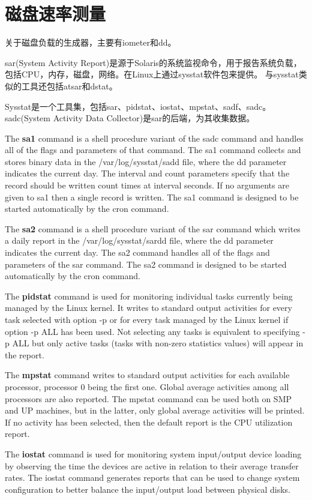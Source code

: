 \section{磁盘速率测量}
关于磁盘负载的生成器，主要有iometer和dd。

sar(System Activity Report)是源于Solaris的系统监视命令，用于报告系统负载，包括CPU，内存，磁盘，网络\cite{wikipedia}。在Linux上通过sysstat软件包来提供。
与sysstat类似的工具还包括atsar和dstat。

Sysstat是一个工具集，包括sar、pidstat、iostat、mpstat、sadf、sadc。sadc(System Activity Data Collector)是sar的后端，为其收集数据。

The \textbf{sa1} command is a shell procedure variant of the sadc command and handles all of the flags and parameters of that command. The sa1 command collects and stores binary data in the /var/log/sysstat/sadd file, where the dd parameter indicates the current day. The interval and  count  parameters specify that the record should be written count times at interval seconds. If no arguments are given to sa1 then a single record is written. The sa1 command is designed to be started automatically by the cron command.

The  \textbf{sa2}  command  is  a  shell  procedure variant of the sar command which writes a daily report in the /var/log/sysstat/sardd file, where the dd parameter indicates the current day. The sa2 command handles all of the flags and parameters of the sar command. The sa2 command is designed to be started automatically by the cron command.

The \textbf{pidstat} command is used for monitoring individual tasks currently being managed by the Linux kernel.  It writes to standard output  activities for  every  task  selected with option -p or for every task managed by the Linux kernel if option -p ALL has been used. Not selecting any tasks is
equivalent to specifying -p ALL but only active tasks (tasks with non-zero statistics values) will appear in the report.

The  \textbf{mpstat} command writes to standard output activities for each available processor, processor 0 being the first one.  Global average activities among all processors are also reported.  The mpstat command can be used both on SMP and UP machines, but in the latter, only global average activities will be printed. If no activity has been selected, then the default report is the CPU utilization report.  

The \textbf{iostat} command is used for monitoring system input/output device loading by observing the time the devices are active  in  relation  to  their average  transfer  rates.  The iostat command generates reports that can be used to change system configuration to better balance the input/output load between physical disks.

